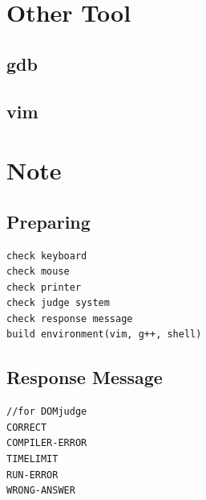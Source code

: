 \documentclass[a4paper, landscape, 8pt]{article}
\begin{document}
\begin{multicols*}{3}
\section{Other Tool}
\subsection{gdb}

\subsection{vim}

\section{Note}
\subsection{Preparing}
\begin{lstlisting}[]
check keyboard
check mouse
check printer
check judge system
check response message
build environment(vim, g++, shell)
\end{lstlisting}
\subsection{Response Message}
\begin{lstlisting}[]
//for DOMjudge
CORRECT
COMPILER-ERROR
TIMELIMIT
RUN-ERROR
WRONG-ANSWER
\end{lstlisting}
\end{multicols*}
\end{document}

